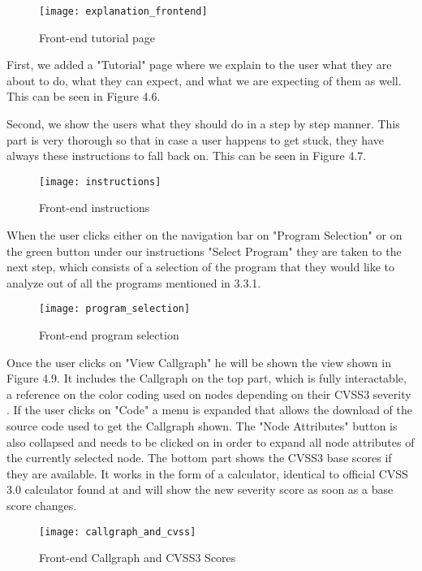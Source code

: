 \begin{figure}[H]
	\caption{Front-end tutorial page}
	\centering
	\texttt{[image: explanation\_frontend]}
\end{figure}

First, we added a "Tutorial" page where we explain to the user what they are about to do, what they can expect, and what we are expecting of them as well. This can be seen in Figure 4.6.

Second, we show the users what they should do in a step by step manner. This part is very thorough so that in case a user happens to get stuck, they have always these instructions to fall back on. This can be seen in Figure 4.7.

\begin{figure}[H]
	\caption{Front-end instructions}
	\centering
	\texttt{[image: instructions]}
\end{figure}

When the user clicks either on the navigation bar on "Program Selection" or on the green button under our instructions "Select Program" they are taken to the next step, which consists of a selection of the program that they would like to analyze out of all the programs mentioned in 3.3.1. 

\begin{figure}[H]
	\caption{Front-end program selection}
	\centering
	\texttt{[image: program\_selection]}
\end{figure}

Once the user clicks on "View Callgraph" he will be shown the view shown in Figure 4.9. It includes the Callgraph on the top part, which is fully interactable, a reference on the color coding used on nodes depending on their CVSS3 severity \parencite{cvss3}. If the user clicks on "Code" a menu is expanded that allows the download of the source code used to get the Callgraph shown. The "Node Attributes" button is also collapsed and needs to be clicked on in order to expand all node attributes of the currently selected node. The bottom part shows the CVSS3 base scores if they are available. It works in the form of a calculator, identical to official CVSS 3.0 calculator found at \parencite{cvss3} and will show the new severity score as soon as a base score changes. 

\begin{figure}[H]
	\caption{Front-end Callgraph and CVSS3 Scores}
	\centering
	\texttt{[image: callgraph\_and\_cvss]}
\end{figure}


